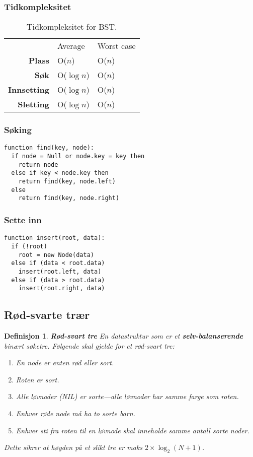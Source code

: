 \documentclass[11pt,a4paper]{article}
\theoremstyle{def}
\newtheorem{definition}[subsection]{Definisjon}
\begin{document}
\subsubsection{Tidkompleksitet}
\begin{table}[h!]
\centering
\begin{tabular}{rll}
&Average&Worst case\\
\textbf{Plass} & O($n$) & O($n$)\\
\textbf{Søk} & O($\log n$) & O($n$)\\
\textbf{Innsetting} & O($\log n$) & O($n$)\\
\textbf{Sletting} & O($\log n$) & O($n$)\\
\end{tabular}
\label{tab:obst}
\caption{Tidkompleksitet for BST.}
\end{table}

\newpage
\subsubsection{Søking}
\begin{Verbatim}[frame=single]
function find(key, node):
  if node = Null or node.key = key then
    return node
  else if key < node.key then
    return find(key, node.left)
  else
    return find(key, node.right)
\end{Verbatim}

\subsubsection{Sette inn}
\begin{Verbatim}[frame=single]
function insert(root, data):
  if (!root)
    root = new Node(data)
  else if (data < root.data)
    insert(root.left, data)
  else if (data > root.data)
    insert(root.right, data)
\end{Verbatim}

\subsection{Rød-svarte trær}
\begin{definition}
\emph{\textbf{Rød-svart tre}}
En datastruktur som er et \textbf{selv-balanserende} binært søketre. Følgende skal gjelde for et rød-svart tre:
\begin{enumerate}
\item
En node er enten rød eller sort.
\item
Roten er sort.
\item
Alle løvnoder (NIL) er sorte---alle løvnoder har samme farge som roten.
\item
Enhver røde node må ha to sorte barn.
\item
Enhver sti fra roten til en løvnode skal inneholde samme antall sorte noder.
\end{enumerate}
Dette sikrer at høyden på et slikt tre er maks $2\times\log_2(N+1)$.
\end{definition}
\end{document}
